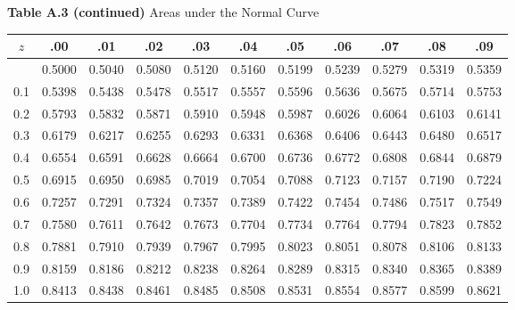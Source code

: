 \documentclass[12pt,a4paper]{article}
\begin{document}
\begin{enumerate}
\begin{center}
\end{center}

\vspace{0.3cm}
\noindent\textbf{Table A.3 (continued)} Areas under the Normal Curve
\vspace{0.2cm}

\begin{center}
\small
\begin{longtable}{ccccccccccc}
\toprule\toprule
$z$ & .00 & .01 & .02 & .03 & .04 & .05 & .06 & .07 & .08 & .09 \\
\midrule
\endhead
\bottomrule\bottomrule
\endfoot
0.0 & 0.5000 & 0.5040 & 0.5080 & 0.5120 & 0.5160 & 0.5199 & 0.5239 & 0.5279 & 0.5319 & 0.5359 \\
0.1 & 0.5398 & 0.5438 & 0.5478 & 0.5517 & 0.5557 & 0.5596 & 0.5636 & 0.5675 & 0.5714 & 0.5753 \\
0.2 & 0.5793 & 0.5832 & 0.5871 & 0.5910 & 0.5948 & 0.5987 & 0.6026 & 0.6064 & 0.6103 & 0.6141 \\
0.3 & 0.6179 & 0.6217 & 0.6255 & 0.6293 & 0.6331 & 0.6368 & 0.6406 & 0.6443 & 0.6480 & 0.6517 \\
0.4 & 0.6554 & 0.6591 & 0.6628 & 0.6664 & 0.6700 & 0.6736 & 0.6772 & 0.6808 & 0.6844 & 0.6879 \\
0.5 & 0.6915 & 0.6950 & 0.6985 & 0.7019 & 0.7054 & 0.7088 & 0.7123 & 0.7157 & 0.7190 & 0.7224 \\
0.6 & 0.7257 & 0.7291 & 0.7324 & 0.7357 & 0.7389 & 0.7422 & 0.7454 & 0.7486 & 0.7517 & 0.7549 \\
0.7 & 0.7580 & 0.7611 & 0.7642 & 0.7673 & 0.7704 & 0.7734 & 0.7764 & 0.7794 & 0.7823 & 0.7852 \\
0.8 & 0.7881 & 0.7910 & 0.7939 & 0.7967 & 0.7995 & 0.8023 & 0.8051 & 0.8078 & 0.8106 & 0.8133 \\
0.9 & 0.8159 & 0.8186 & 0.8212 & 0.8238 & 0.8264 & 0.8289 & 0.8315 & 0.8340 & 0.8365 & 0.8389 \\
1.0 & 0.8413 & 0.8438 & 0.8461 & 0.8485 & 0.8508 & 0.8531 & 0.8554 & 0.8577 & 0.8599 & 0.8621 \\

\end{longtable}
\end{center}
\end{enumerate}
\end{document}

